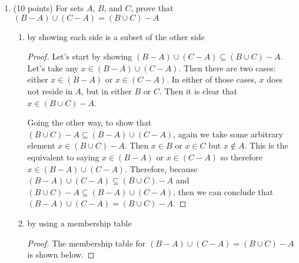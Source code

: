 \documentclass[11pt]{article}
\begin{document}
\begin{enumerate}
\begin{proof}

To prove this, we need to show that for any element of $A \times B$, that element is also in $C \times D$.  To do this, let's take some arbitary $(x,y) \in A \times B$.  That is, $x \in A$ and $y \in B$.  Since $A \subseteq C$ and $B \subseteq D$, then it is clear that $x \in C$ and $y \in D$ and therefore we have that $(x,y) \in C \times D$.  In other words, we have proven that $A \times B \subseteq C \times D$.  

\end{proof}

\item (10 points) For sets $A$, $B$, and $C$, prove that 
$(B-A)\cup(C-A)=(B\cup C)-A$
\begin{enumerate}
\item by showing each side is a subset of the other side

\begin{proof}

Let's start by showing $(B-A)\cup(C-A) \subseteq (B\cup C)-A$.  Let's take any $x \in (B-A)\cup(C-A)$.  Then there are two cases: either $x \in (B-A)$ or $x \in (C-A)$.  In either of those cases, $x$ does not reside in $A$, but in either $B$ or $C$.  Then it is clear that $x \in (B \cup C) - A$.  

Going the other way, to show that $(B\cup C)-A \subseteq (B-A)\cup(C-A)$, again we take some arbitrary element $x \in (B \cup C) - A$.  Then $x \in B$ or $x \in C$ but $x \not \in A$.  This is the equivalent to saying $x \in (B-A)$ or $x \in (C-A)$ so therefore $x \in (B-A) \cup (C-A)$.  
Therefore, because $(B-A) \cup (C-A) \subseteq (B \cup C) - A$ and $(B \cup C) - A \subseteq (B-A) \cup (C-A)$, then we can conclude that $(B-A)\cup(C-A)=(B\cup C)-A$.  

\end{proof}

\item by using a membership table

\begin{proof}

The membership table for $(B-A)\cup(C-A)=(B\cup C)-A$ is shown below.  


\end{proof}
\end{enumerate}
\end{enumerate}
\end{document}
